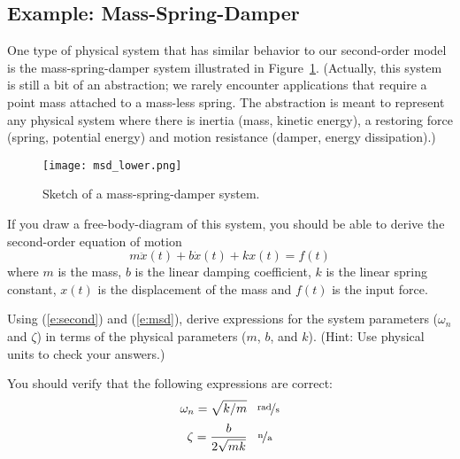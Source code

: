 \subsection{Example: Mass-Spring-Damper}
One type of physical system that has similar behavior to our second-order model is the mass-spring-damper system illustrated in Figure~\ref{f:msd2}.  (Actually, this system is still a bit of an abstraction; we rarely encounter applications that require a point mass attached to a mass-less spring.  The abstraction is meant to represent any physical system where there is inertia (mass, kinetic energy), a restoring force (spring, potential energy) and motion resistance (damper, energy dissipation).)
\begin{figure}[htb!]
\centerline{
{\texttt{[image: msd\_lower.png]}}}
\caption{Sketch of a mass-spring-damper system.}
\label{f:msd2}
\end{figure}

If you draw a free-body-diagram of this system, you should be able to derive the second-order equation of motion
\begin{equation}\label{e:msd}
m \ddot{x}(t) + b \dot{x}(t) + k x(t) = f(t)
\end{equation}
where $m$ is the mass, $b$ is the linear damping coefficient, $k$ is the linear spring constant, $x(t)$ is the displacement of the mass and $f(t)$ is the input force.

\begin{ex}
Using (\ref{e:second}) and (\ref{e:msd}), derive expressions for the system parameters ($\omega_n$ and $\zeta$) in terms of the physical parameters ($m$, $b$, and $k$).  (Hint: Use physical units to check your answers.)
\end{ex}

\ifsolutions
\begin{soln}
You should verify that the following expressions are correct:
\[ \omega_n = \sqrt{k/m} \; \; \; \unitfrac[]{rad}{s}\]
\[ \zeta = \frac{b}{2 \sqrt{mk}} \; \; \; \unitfrac[]{n}{a} \]
\end{soln}
\fi



